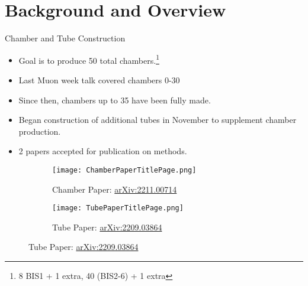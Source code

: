 \begin{frame}
	\titlepage
\end{frame}
\begin{frame}
	\tableofcontents
\end{frame}
\section*{Background and Overview}
	\begin{frame}{Chamber and Tube Construction}
		\begin{itemize}
			\item Goal is to produce 50 total chambers.\footnote{\tiny 8 BIS1 + 1 extra, 40 (BIS2-6) + 1 extra}
			\item Last Muon week talk covered chambers 0-30
			\item Since then, chambers up to 35 have been fully made.
			\item Began construction of additional tubes in November to supplement chamber production.
			\item 2 papers accepted for publication on methods. 
		\end{itemize}
		\begin{figure}
			\centering
			\begin{subfigure}[c]{0.4\pdfpagewidth}
				\texttt{[image: ChamberPaperTitlePage.png]}
				\caption*{Chamber Paper: \href{https://arxiv.org/abs/2211.00714}{arXiv:2211.00714}}
			\end{subfigure}
			\begin{subfigure}[c]{0.4\pdfpagewidth}
				\texttt{[image: TubePaperTitlePage.png]}
				\caption*{Tube Paper: \href{https://arxiv.org/abs/2209.03864}{arXiv:2209.03864}}
			\end{subfigure}
		\end{figure}
	\end{frame}